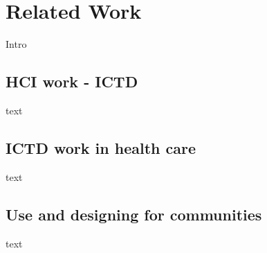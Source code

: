 \section{Related Work}
Intro

\subsection{HCI work - ICTD}
text

\subsection{ICTD work in health care}
text

\subsection{Use and designing for communities}
text